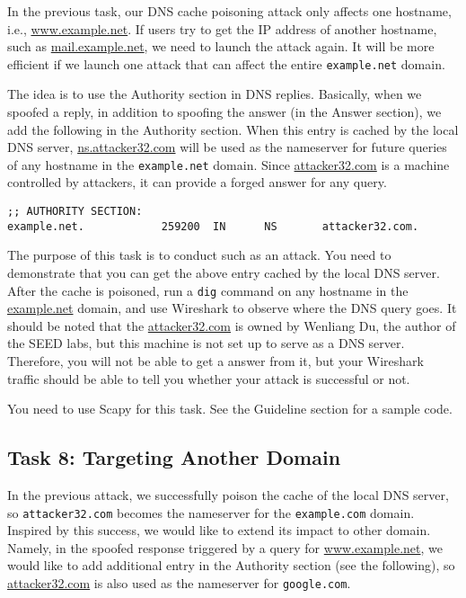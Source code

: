 In the previous task, our DNS cache poisoning attack only affects 
one hostname, i.e., \url{www.example.net}. If users try to get the IP
address of another hostname, such as \url{mail.example.net}, we 
need to launch the attack again. It will be more efficient if we launch one
attack that can affect the entire \texttt{example.net} domain.  

The idea is to use the Authority section in DNS replies. 
Basically, when we spoofed a reply, in addition to spoofing the answer (in
the Answer section), we add the following in the Authority section.
When this entry is cached by the local DNS server, \url{ns.attacker32.com}
will be used as the nameserver for future queries of 
any hostname in the \texttt{example.net} domain.  Since 
\url{attacker32.com} is a machine controlled by attackers, it can
provide a forged answer for any query.

\begin{lstlisting}
;; AUTHORITY SECTION:
example.net.            259200  IN      NS       attacker32.com.
\end{lstlisting}
 
 
The purpose of this task is to conduct such as an attack. You need to
demonstrate that you can get the above entry cached by the local DNS 
server. After the cache is poisoned, run a \texttt{dig} command 
on any hostname in the \url{example.net} domain, and use 
Wireshark to observe where the DNS query goes. 
It should be noted that the \url{attacker32.com} is owned by
Wenliang Du, the author of the SEED labs, but this 
machine is not set up to serve as a DNS server. Therefore, you will not be
able to get a answer from it, but your Wireshark traffic should 
be able to tell you whether your attack is successful or not.


You need to use Scapy for this task. See the Guideline section for 
a sample code. 


\subsection{Task 8: Targeting Another Domain} 

In the previous attack, we successfully poison the cache of the local DNS
server, so \texttt{attacker32.com} becomes the nameserver for the 
\texttt{example.com} domain. Inspired by this success, we would like to 
extend its impact to other domain. Namely, 
in the spoofed response triggered by a query for
\url{www.example.net}, we would like to add additional entry
in the Authority section (see the following), so
\url{attacker32.com} is also used as the nameserver for 
\texttt{google.com}.  


